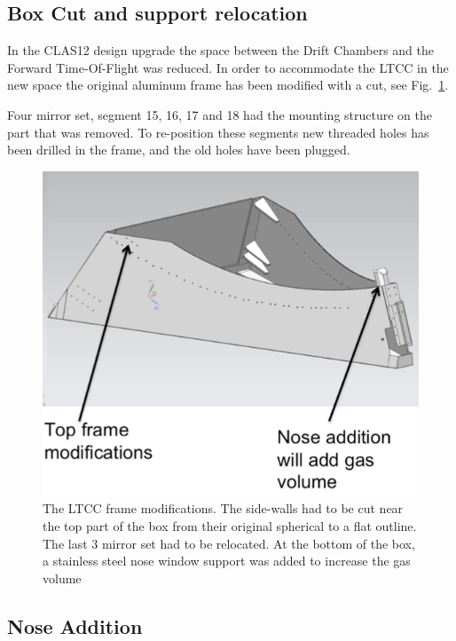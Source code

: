 \subsection{Box Cut and support relocation }

In the CLAS12 design upgrade the space between the Drift Chambers and the Forward Time-Of-Flight was reduced.
In order to accommodate the LTCC in the new space the original aluminum frame has been modified with a cut, see Fig.~\ref{fig:boxCut}.

Four mirror set, segment 15, 16, 17 and 18 had the mounting structure on the part that was removed.
To re-position these segments new threaded holes has been drilled in the frame, and the old holes have been plugged.

\begin{figure}[h]
	\centering
	\includegraphics[width=1.0\columnwidth,keepaspectratio]{img/boxCut.png}
	\caption{The LTCC frame modifications. The side-walls had to be cut near the top part of the box from their original
            spherical to a flat outline. The last 3 mirror set had to be relocated. At the bottom of the box, a stainless steel
            nose window support was added to increase the gas volume}
	\label{fig:boxCut}
\end{figure}


\subsection{Nose Addition}

